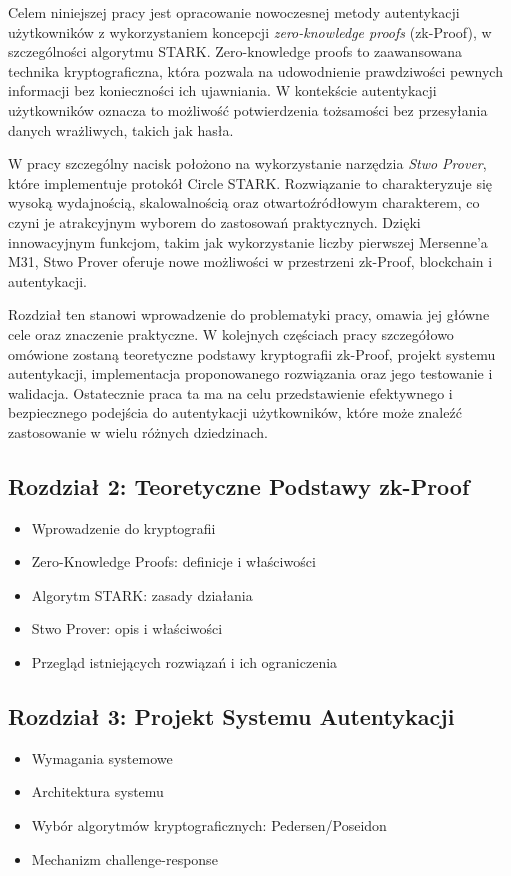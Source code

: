 \documentclass{article}
\begin{document}
Celem niniejszej pracy jest opracowanie nowoczesnej metody autentykacji użytkowników z wykorzystaniem koncepcji
\textit{zero-knowledge proofs} (zk-Proof), w szczególności algorytmu STARK. 
Zero-knowledge proofs to zaawansowana technika kryptograficzna, która pozwala na udowodnienie prawdziwości pewnych informacji bez konieczności ich ujawniania.
W kontekście autentykacji użytkowników oznacza to możliwość potwierdzenia tożsamości bez przesyłania danych wrażliwych, takich jak hasła.

W pracy szczególny nacisk położono na wykorzystanie narzędzia \textit{Stwo Prover}, które implementuje protokół Circle STARK. 
Rozwiązanie to charakteryzuje się wysoką wydajnością, skalowalnością oraz otwartoźródłowym charakterem, 
co czyni je atrakcyjnym wyborem do zastosowań praktycznych. Dzięki innowacyjnym funkcjom, takim jak wykorzystanie liczby pierwszej Mersenne'a M31, 
Stwo Prover oferuje nowe możliwości w przestrzeni zk-Proof, blockchain i autentykacji.

Rozdział ten stanowi wprowadzenie do problematyki pracy, omawia jej główne cele oraz znaczenie praktyczne. 
W kolejnych częściach pracy szczegółowo omówione zostaną teoretyczne podstawy kryptografii zk-Proof, projekt systemu autentykacji, 
implementacja proponowanego rozwiązania oraz jego testowanie i walidacja. Ostatecznie praca ta ma na celu przedstawienie efektywnego i 
bezpiecznego podejścia do autentykacji użytkowników, które może znaleźć zastosowanie w wielu różnych dziedzinach.


\subsection{Rozdział 2: Teoretyczne Podstawy zk-Proof}
\begin{itemize}
    \item Wprowadzenie do kryptografii
    \item Zero-Knowledge Proofs: definicje i właściwości
    \item Algorytm STARK: zasady działania
    \item Stwo Prover: opis i właściwości
    \item Przegląd istniejących rozwiązań i ich ograniczenia
\end{itemize}

\subsection{Rozdział 3: Projekt Systemu Autentykacji}
\begin{itemize}
    \item Wymagania systemowe
    \item Architektura systemu
    \item Wybór algorytmów kryptograficznych: Pedersen/Poseidon
    \item Mechanizm challenge-response
\end{itemize}
\end{document}
